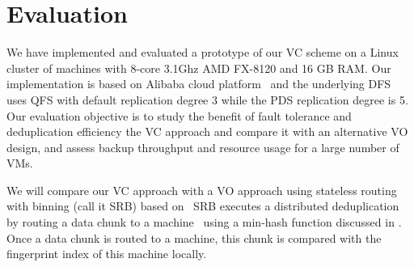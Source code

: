 
\section{Evaluation}
\label{sect:exper}

We have implemented and evaluated a prototype of our VC scheme on a Linux cluster of machines with
8-core 3.1Ghz AMD FX-8120 and 16 GB RAM. 
Our implementation is based on Alibaba cloud platform~\cite{Aliyun,WeiZhangIEEE}
and the underlying DFS uses  QFS with default replication degree 3 while the PDS replication degree is 5.
Our evaluation objective is to
study the benefit of fault tolerance and   deduplication efficiency  the VC approach and compare it
with an alternative VO design, and assess backup throughput and  resource usage for a large number of VMs.


We will compare our VC approach with
a VO approach  using stateless routing with binning (call it SRB) 
based on~\cite{ParallelDataDomain,Extremebining}
SRB executes a distributed deduplication by routing a data chunk to a machine~\cite{ParallelDataDomain}
using  a min-hash function discussed in \cite{Extremebining}. Once a data chunk is routed to
a machine, this chunk is compared with the fingerprint index of this machine locally. 

